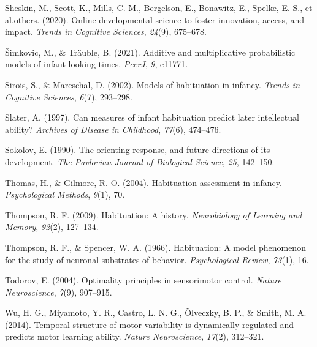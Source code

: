 \documentclass[10pt, letterpaper]{article}
\newenvironment{CSLReferences}%
  {}%
  {\par}
\begin{document}
\begin{CSLReferences}{1}{0}
\leavevmode{}%
Sheskin, M., Scott, K., Mills, C. M., Bergelson, E., Bonawitz, E.,
Spelke, E. S., et al.others. (2020). Online developmental science to
foster innovation, access, and impact. \emph{Trends in Cognitive
Sciences}, \emph{24}(9), 675--678.

\leavevmode{}%
Šimkovic, M., \& Träuble, B. (2021). Additive and multiplicative
probabilistic models of infant looking times. \emph{PeerJ}, \emph{9},
e11771.

\leavevmode{}%
Sirois, S., \& Mareschal, D. (2002). Models of habituation in infancy.
\emph{Trends in Cognitive Sciences}, \emph{6}(7), 293--298.

\leavevmode{}%
Slater, A. (1997). Can measures of infant habituation predict later
intellectual ability? \emph{Archives of Disease in Childhood},
\emph{77}(6), 474--476.

\leavevmode{}%
Sokolov, E. (1990). The orienting response, and future directions of its
development. \emph{The Pavlovian Journal of Biological Science},
\emph{25}, 142--150.

\leavevmode{}%
Thomas, H., \& Gilmore, R. O. (2004). Habituation assessment in infancy.
\emph{Psychological Methods}, \emph{9}(1), 70.

\leavevmode{}%
Thompson, R. F. (2009). Habituation: A history. \emph{Neurobiology of
Learning and Memory}, \emph{92}(2), 127--134.

\leavevmode{}%
Thompson, R. F., \& Spencer, W. A. (1966). Habituation: A model
phenomenon for the study of neuronal substrates of behavior.
\emph{Psychological Review}, \emph{73}(1), 16.

\leavevmode{}%
Todorov, E. (2004). Optimality principles in sensorimotor control.
\emph{Nature Neuroscience}, \emph{7}(9), 907--915.

\leavevmode{}%
Wu, H. G., Miyamoto, Y. R., Castro, L. N. G., Ölveczky, B. P., \& Smith,
M. A. (2014). Temporal structure of motor variability is dynamically
regulated and predicts motor learning ability. \emph{Nature
Neuroscience}, \emph{17}(2), 312--321.

\end{CSLReferences}


\end{document}
